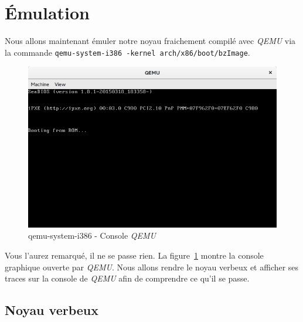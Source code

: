 \documentclass[a4paper]{article}
\begin{document}
\clearpage
\section{Émulation}

Nous allons maintenant émuler notre noyau fraichement compilé avec \textit{QEMU} via la commande \lstset{language=sh}\lstinline{qemu-system-i386 -kernel arch/x86/boot/bzImage}.\\

\begin{figure}
\label{fig:qemu_first_run}
\includegraphics[scale=0.5]{../res/qemu-first-run.png}
\caption{qemu-system-i386 - Console \textit{QEMU}}
\end{figure}

Vous l'aurez remarqué, il ne se passe rien. La figure~\ref{fig:qemu_first_run} montre la console graphique ouverte par \textit{QEMU}. Nous allons rendre le noyau verbeux et afficher ses traces sur la console de \textit{QEMU} afin de comprendre ce qu'il se passe.

\subsection{Noyau verbeux}
\end{document}
